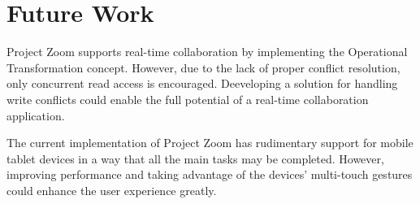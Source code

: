 \section{Future Work}
Project Zoom supports real-time collaboration by implementing the Operational Transformation concept.  However, due to the lack of proper conflict resolution, only concurrent read access is encouraged. Deeveloping a solution for handling write conflicts could enable the full potential of a real-time collaboration application.

The current implementation of Project Zoom has rudimentary support for mobile tablet devices in a way that all the main tasks may be completed. However, improving performance and taking advantage of the devices' multi-touch gestures could enhance the user experience greatly.


